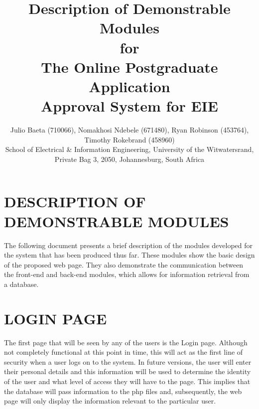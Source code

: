 \documentclass[journal,comsoc,onecolumn]{IEEEtran}
\begin{document}
	
	
\title{Description of Demonstrable Modules \\ \vspace{7mm} for \\ \vspace{7mm} The Online Postgraduate Application \\ Approval System for EIE}
	
\author{\vspace{3mm} Julio Baeta (710066), Nomakhosi Ndebele (671480), Ryan Robinson (453764), Timothy Rokebrand (458960)\\ \small \vspace{2mm} School of Electrical \& Information Engineering, University of the Witwatersrand, Private Bag 3, 2050, Johannesburg, South Africa}
	
\markboth{}{}
	
\maketitle

\thispagestyle{empty}
\pagestyle{empty}
	
	
\newpage

\pagestyle{empty}

\section{DESCRIPTION OF DEMONSTRABLE MODULES}
The following document presents a brief description of the modules developed for the system that has been produced thus far. These modules show the basic design of the proposed web page. They also demonstrate the communication between the front-end and back-end modules, which allows for information retrieval from a database.


\section{LOGIN PAGE}
The first page that will be seen by any of the users is the Login page. Although not completely functional at this point in time, this will act as the first line of security when a user logs on to the system.  In future versions, the user will enter their personal details and this information will be used to determine the identity of the user and what level of access they will have to the page. This implies that the database will pass information to the php files and, subsequently, the web page will only display the information relevant to the particular user.
	
\end{document}
